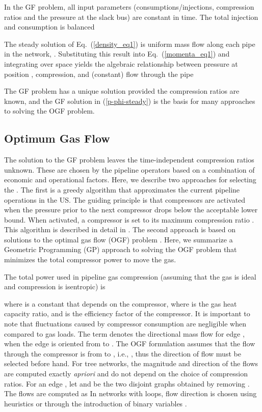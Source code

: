 \documentclass[10pt, conference, compsocconf]{IEEEtran}
\begin{document}
In the GF problem, all input parameters (consumptions/injections, compression ratios and the pressure at the slack bus) are constant in time. The total injection and consumption is balanced


The steady solution of Eq.~(\ref{density_eq1}) is uniform mass flow along each pipe in the network, . Substituting this result into Eq.~(\ref{momenta_eq1}) and integrating over space yields the algebraic relationship between pressure at position , compression, and (constant) flow through the pipe

The GF problem has a unique solution provided the compression ratios are known, and the GF solution in (\ref{p-phi-steady}) is the basis for many approaches to solving the OGF problem.

\subsection{Optimum Gas Flow}

The solution to the GF problem leaves the time-independent compression ratios  unknown.  These are chosen by the pipeline operators based on a combination of economic and operational factors. Here, we describe two approaches for selecting the .  The first is a greedy algorithm that approximates the current pipeline operations in the US.  The guiding principle is that compressors are activated when the pressure prior to the next compressor drops below the acceptable lower bound.  When activated, a compressor is set to its maximum compression ratio . This algorithm is described in detail in \cite{13MFBBCP}. The second approach is based on solutions to the optimal gas flow (OGF) problem \cite{68WL,00WRBS,10Bor,13MFBBCP}.  Here, we summarize a Geometric Programming (GP) approach to solving the OGF problem that minimizes the total compressor power to move the gas.


The total power used in pipeline gas compression (assuming that the gas is ideal and compression is isentropic) is

where  is a constant that depends on the compressor,  where  is the gas heat capacity ratio, and  is the efficiency factor of the compressor. It is important to note that fluctuations caused by compressor consumption are negligible when compared to gas loads. The term  denotes the {directional mass} flow for edge , when the edge is oriented from  to . The OGF formulation assumes that
the flow through the compressor is from  to , i.e., , thus the direction of flow must be selected before hand. For tree networks, the magnitude and direction of the flows are computed exactly {\it apriori} and do not depend on the choice of compression ratios. For an edge , let  and
 be the two disjoint graphs obtained by removing . The flows  are computed as 
In networks with loops, flow direction is chosen using heuristics or through the introduction of binary variables \cite{10Bor}.
\end{document}
